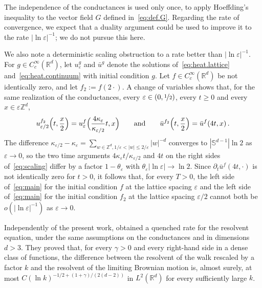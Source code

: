 \documentclass[11pt]{amsart}
\numberwithin{equation}{section}
\newcommand{\Z}{\mathbb{Z}}
\newcommand{\R}{\mathbb{R}}
\newcommand{\eps}{\varepsilon}
\newcommand{\Leps}{\mathcal{L}^\varepsilon}
\newcommand{\nf}{\nicefrac}
\begin{document}
The independence of the conductances is used only once, to apply Hoeffding's inequality to the vector field $G$ defined in~\eqref{eq:def.G}.
Regarding the rate of convergence, we expect that a duality argument could be used to improve it to the rate $|\ln \eps|^{-1}$; we do not pursue this here.

We also note a deterministic scaling obstruction to a rate better than $|\ln \eps|^{-1}$.
For $g \in C^\infty_c(\R^d)$, let $u^g_\eps$ and $\bar u^g$ denote the solutions of~\eqref{eq:heat.lattice} and~\eqref{eq:heat.continuum} with initial condition $g$.
Let $f \in C^\infty_c(\R^d)$ be not identically zero, and let $f_2 := f(2 \cdot)$.
A change of variables shows that, for the same realization of the conductances, every $\eps \in (0, \nf12)$, every $t \geq 0$ and every $x \in \eps \Z^d$,
\begin{equation} \label{eq:scaling}
    u^{f_2}_{\eps/2} \Bigl( t, \frac{x}{2} \Bigr) = u^f_\eps \Bigl( \frac{4 \kappa_\eps}{\kappa_{\eps/2}} t, x \Bigr)
    \qquad \text{and} \qquad
    \bar u^{f_2} \Bigl( t, \frac{x}{2} \Bigr) = \bar u^f (4t, x)\,.
\end{equation}
The difference $\kappa_{\eps/2} - \kappa_\eps = \sum_{w \in \Z^d, 1/\eps < |w| \leq 2/\eps} |w|^{-d}$ converges to $|\mathbb{S}^{d-1}| \ln 2$ as $\eps \to 0$, so the two time arguments $4 \kappa_\eps t / \kappa_{\eps/2}$ and $4t$ on the right sides of~\eqref{eq:scaling} differ by a factor $1 - \theta_\eps$ with $\theta_\eps |\ln \eps| \to \ln 2$.
Since $\partial_t \bar u^f(4t, \cdot)$ is not identically zero for $t > 0$, it follows that, for every $T > 0$, the left side of~\eqref{eq:main} for the initial condition $f$ at the lattice spacing $\eps$ and the left side of~\eqref{eq:main} for the initial condition $f_2$ at the lattice spacing $\eps/2$ cannot both be $o(|\ln \eps|^{-1})$ as $\eps \to 0$.

Independently of the present work, \citet*[Theorem~1.1]{CGW2026} obtained a quenched rate for the resolvent equation, under the same assumptions on the conductances and in dimensions $d > 3$.
They proved that, for every $\gamma > 0$ and every right-hand side in a dense class of functions, the difference between the resolvent of the walk rescaled by a factor $k$ and the resolvent of the limiting Brownian motion is, almost surely, at most $C (\ln k)^{-1/2 + (1+\gamma)/(2(d-2))}$ in $L^2(\R^d)$ for every sufficiently large $k$.
\end{document}
